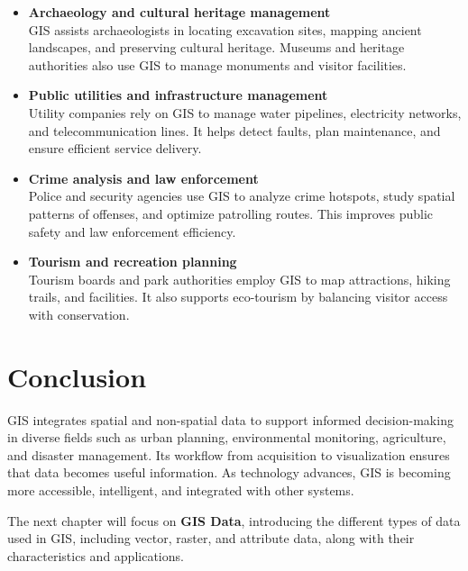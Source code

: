 \documentclass[
  11pt,
  letterpaper,
]{book}
\begin{document}
\begin{itemize}
  \textbf{Climate change studies}\\
  Researchers use GIS to model rising sea levels, shifting vegetation
  zones, glacial retreat, and temperature variations. This helps
  governments plan mitigation and adaptation strategies at both local
  and global scales.
\item
  \textbf{Archaeology and cultural heritage management}\\
  GIS assists archaeologists in locating excavation sites, mapping
  ancient landscapes, and preserving cultural heritage. Museums and
  heritage authorities also use GIS to manage monuments and visitor
  facilities.
\item
  \textbf{Public utilities and infrastructure management}\\
  Utility companies rely on GIS to manage water pipelines, electricity
  networks, and telecommunication lines. It helps detect faults, plan
  maintenance, and ensure efficient service delivery.
\item
  \textbf{Crime analysis and law enforcement}\\
  Police and security agencies use GIS to analyze crime hotspots, study
  spatial patterns of offenses, and optimize patrolling routes. This
  improves public safety and law enforcement efficiency.
\item
  \textbf{Tourism and recreation planning}\\
  Tourism boards and park authorities employ GIS to map attractions,
  hiking trails, and facilities. It also supports eco-tourism by
  balancing visitor access with conservation.
\end{itemize}

\section{Conclusion}\label{conclusion-5}

GIS integrates spatial and non-spatial data to support informed
decision-making in diverse fields such as urban planning, environmental
monitoring, agriculture, and disaster management. Its workflow from
acquisition to visualization ensures that data becomes useful
information. As technology advances, GIS is becoming more accessible,
intelligent, and integrated with other systems.

The next chapter will focus on \textbf{GIS Data}, introducing the
different types of data used in GIS, including vector, raster, and
attribute data, along with their characteristics and applications.
\end{document}
